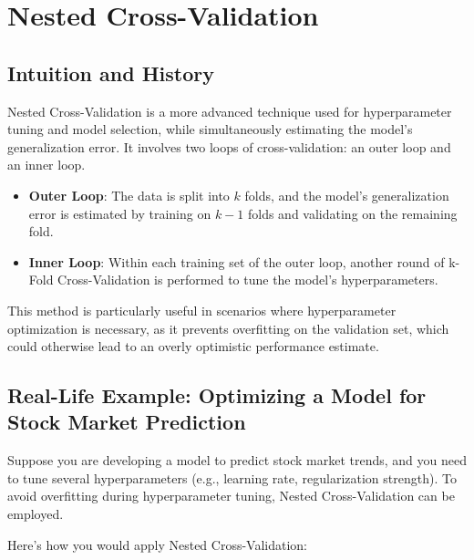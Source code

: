 \documentclass[10pt]{article}
\begin{document}
\section{Nested Cross-Validation}
\subsection{Intuition and History}
Nested Cross-Validation is a more advanced technique used for hyperparameter tuning and model selection, while simultaneously estimating the model’s generalization error. It involves two loops of cross-validation: an outer loop and an inner loop.

\begin{itemize}
    \item \textbf{Outer Loop}: The data is split into \(k\) folds, and the model’s generalization error is estimated by training on \(k-1\) folds and validating on the remaining fold.
    \item \textbf{Inner Loop}: Within each training set of the outer loop, another round of k-Fold Cross-Validation is performed to tune the model’s hyperparameters.
\end{itemize}

This method is particularly useful in scenarios where hyperparameter optimization is necessary, as it prevents overfitting on the validation set, which could otherwise lead to an overly optimistic performance estimate.

\subsection{Real-Life Example: Optimizing a Model for Stock Market Prediction}
Suppose you are developing a model to predict stock market trends, and you need to tune several hyperparameters (e.g., learning rate, regularization strength). To avoid overfitting during hyperparameter tuning, Nested Cross-Validation can be employed.

Here’s how you would apply Nested Cross-Validation:
\end{document}
